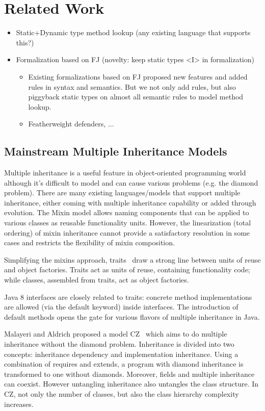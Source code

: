 \section{Related Work}

\begin{itemize}
	\item Static+Dynamic type method lookup (any existing language that supports this?)
	\item Formalization based on FJ (novelty: keep static types <I> in formalization)
		\begin{itemize}
			\item Existing formalizations based on FJ proposed new features and added rules in syntax and semantics. But we not only add rules, but also piggyback static types on almost all semantic rules to model method lookup. 
			\item Featherweight defenders, ...
		\end{itemize}
\end{itemize}

\subsection{Mainstream Multiple Inheritance Models}
Multiple inheritance is a useful feature in object-oriented programming world although it's difficult to model and can 
cause various problems (e.g. the diamond problem).  There are many existing languages/models that support multiple 
inheritance, either coming with multiple inheritance capability or added through evolution. The Mixin model allows naming components 
that can be applied to various classes as reusable functionality units. However, the linearization (total ordering) of mixin 
inheritance cannot provide a satisfactory resolution in some cases and restricts the flexibility of mixin composition. 

Simplifying the mixins approach, traits~\cite{scharli03traits} draw a strong line between units of reuse and object factories. 
Traits act as units of reuse, containing functionality code; while classes, assembled from traits, act as object factories. 

Java 8 interfaces are closely related to traits: concrete method implementations are allowed (via the default keyword) inside interfaces. 
The introduction of default methods opens the gate for various flavors of multiple inheritance in Java.

Malayeri and Aldrich proposed a model CZ~\cite{malayeri2009cz} which aims to do multiple inheritance without the diamond problem. 
Inheritance is divided into two concepts: inheritance dependency and implementation inheritance. 
Using a combination of requires and extends, a program with diamond inheritance is transformed to one without diamonds. 
Moreover, fields and multiple inheritance can coexist. However untangling inheritance also untangles the class structure. 
In CZ, not only the number of classes, but also the class hierarchy complexity increases. 

